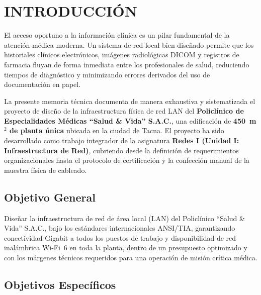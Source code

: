 \chapter*{INTRODUCCIÓN}

El acceso oportuno a la información clínica es un pilar fundamental de la atención médica moderna. Un sistema de red local bien diseñado permite que los historiales clínicos electrónicos, imágenes radiológicas DICOM y registros de farmacia fluyan de forma inmediata entre los profesionales de salud, reduciendo tiempos de diagnóstico y minimizando errores derivados del uso de documentación en papel.

La presente memoria técnica documenta de manera exhaustiva y sistematizada el proyecto de diseño de la infraestructura física de red LAN del \textbf{Policlínico de Especialidades Médicas ``Salud \& Vida'' S.A.C.}, una edificación de \textbf{450~m$^2$ de planta única} ubicada en la ciudad de Tacna. El proyecto ha sido desarrollado como trabajo integrador de la asignatura \textbf{Redes I (Unidad I: Infraestructura de Red)}, cubriendo desde la definición de requerimientos organizacionales hasta el protocolo de certificación y la confección manual de la muestra física de cableado.

\section*{Objetivo General}

Diseñar la infraestructura de red de área local (LAN) del Policlínico ``Salud \& Vida'' S.A.C., bajo los estándares internacionales ANSI/TIA, garantizando conectividad Gigabit a todos los puestos de trabajo y disponibilidad de red inalámbrica Wi-Fi~6 en toda la planta, dentro de un presupuesto optimizado y con los márgenes técnicos requeridos para una operación de misión crítica médica.

\section*{Objetivos Específicos}

